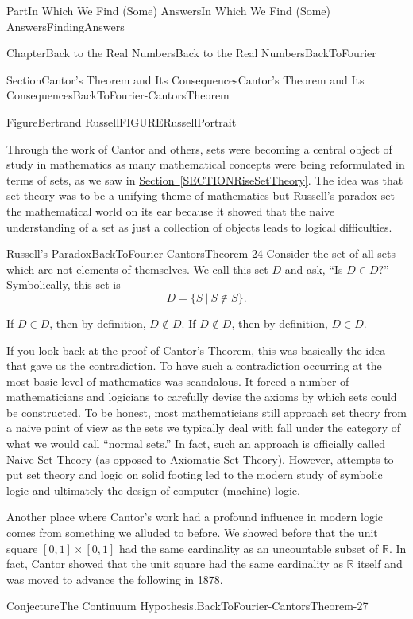 \documentclass[oneside,10pt,]{book}
\newcommand{\xreffont}{\relax}
\numberwithin{equation}{part}
\newcommand{\RR}{\mathbb {R}}
\begin{document}
\begin{partptx}{Part}{In Which We Find (Some) Answers}{}{In Which We Find (Some) Answers}{}{}{FindingAnswers}
\begin{chapterptx}{Chapter}{Back to the Real Numbers}{}{Back to the Real Numbers}{}{}{BackToFourier}
\begin{sectionptx}{Section}{Cantor's Theorem and Its Consequences}{}{Cantor's Theorem and Its Consequences}{}{}{BackToFourier-CantorsTheorem}
\begin{figureptx}{Figure}{Bertrand Russell}{FIGURERussellPortrait}{}
\begin{image}{0.325}{0.35}{0.325}{}
\end{image}%
\tcblower
\end{figureptx}%
Through the work of Cantor and others, sets were becoming a central object of study in mathematics as many mathematical concepts were being reformulated in terms of sets, as we saw in \hyperref[SECTIONRiseSetTheory]{Section~{\xreffont\ref{SECTIONRiseSetTheory}}}.  The idea was that set theory was to be a unifying theme of mathematics but Russell's paradox set the mathematical world on its ear because it showed that the naive understanding of a set as just a collection of objects leads to logical difficulties.%
\begin{fact}{Russell's Paradox}{}{}{BackToFourier-CantorsTheorem-24}%
%
Consider the set of all sets which are not elements of themselves.  We call this set \(D\) and ask, ``Is \(D\in D?\)'' Symbolically, this set is%
\begin{equation*}
D=\{S\ |\ S\not \in S\} \text{.}
\end{equation*}
%
\par
If \(D\in D\), then by definition, \(D\not\in D\).  If \(D\not\in D\), then by definition, \(D\in D\).%
\end{fact}
If you look back at the proof of Cantor's Theorem, this was basically the idea that gave us the contradiction.  To have such a contradiction occurring at the most basic level of mathematics was scandalous.  It forced a number of mathematicians and logicians to carefully devise the axioms by which sets could be constructed.  To be honest, most mathematicians still approach set theory from a naive point of view as the sets we typically deal with fall under the category of what we would call ``normal sets.'' In fact, such an approach is officially called Naive Set Theory (as opposed to \href{https://mathshistory.st-andrews.ac.uk/HistTopics/Beginnings_of_set_theory/}{Axiomatic Set Theory}). However, attempts to put set theory and logic on solid footing led to the modern study of symbolic logic and ultimately the design of computer (machine) logic.%
\par
{} Another place where Cantor's work had a profound influence in modern logic comes from something we alluded to before.  We showed before that the unit square \([0,1]\times [0,1]\) had the same cardinality as an uncountable subset of \(\RR\).  In fact, Cantor showed that the unit square had the same cardinality as \(\RR\) itself and was moved to advance the following in 1878.%
\begin{conjecture}{Conjecture}{The Continuum Hypothesis.}{}{BackToFourier-CantorsTheorem-27}%

\end{conjecture}
\end{sectionptx}
\end{chapterptx}
\end{partptx}
\end{document}

